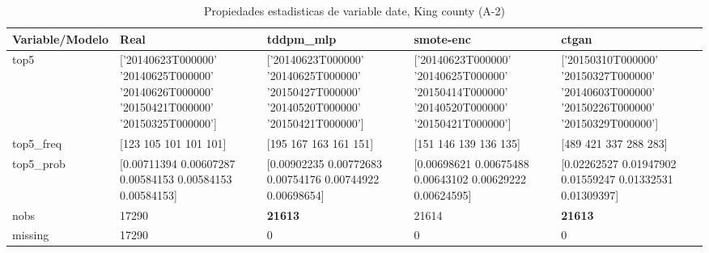 \begin{table}[H]
\centering
\fontsize{8}{14}\selectfont
\caption{Propiedades  estadisticas de variable date, King county (A-2)}
\label{table-stats-king county-a-2-date}
\begin{tabular}{|l|m{10em}|m{10em}|m{10em}|m{10em}|}
\hline
 \rowcolor[gray]{0.8}
Variable/Modelo & Real & tddpm\_mlp & smote-enc & ctgan \\
\hline top5 & ['20140623T000000' '20140625T000000' '20140626T000000' '20150421T000000'
 '20150325T000000'] & ['20140623T000000' '20140625T000000' '20150427T000000' '20140520T000000'
 '20150421T000000'] & ['20140623T000000' '20140625T000000' '20150414T000000' '20140520T000000'
 '20150421T000000'] & ['20150310T000000' '20150327T000000' '20140603T000000' '20150226T000000'
 '20150329T000000'] \\
\hline top5\_freq & [123 105 101 101 101] & [195 167 163 161 151] & [151 146 139 136 135] & [489 421 337 288 283] \\
\hline top5\_prob & [0.00711394 0.00607287 0.00584153 0.00584153 0.00584153] & [0.00902235 0.00772683 0.00754176 0.00744922 0.00698654] & [0.00698621 0.00675488 0.00643102 0.00629222 0.00624595] & [0.02262527 0.01947902 0.01559247 0.01332531 0.01309397] \\
\hline nobs & 17290 & \bfseries 21613 & \cellcolor[rgb]{0.9, 0.54, 0.52} 21614 & \bfseries 21613 \\
\hline missing & 17290 & 0 & 0 & 0 \\
\hline
\end{tabular}
\end{table}
